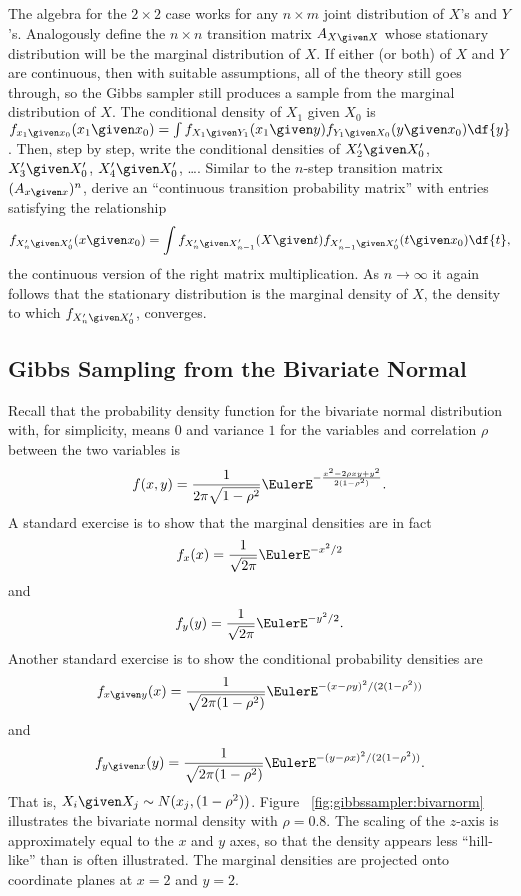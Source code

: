 \documentclass[12pt]{article}
\begin{document}
The algebra for the \( 2 \times 2 \) case works for any \( n \times m \)
joint distribution of \( X \)'s and \( Y \)'s.  Analogously define the \(
n \times n \) transition matrix \( A_{X \given X} \) whose stationary
distribution will be the marginal distribution of \( X \).  If either (or
both) of \( X \) and \( Y \) are continuous, then with suitable
assumptions, all of the theory still goes through, so the Gibbs sampler
still produces a sample from the marginal distribution of \( X \).  The
conditional density of \( X_1 \) given \( X_0 \) is \( f_{x_1 \given x_0}
(x_1 \given x_0) = \int f_{X_1 \given Y_1}(x_1 \given y)f_{Y_1 \given X_0}
(y \given x_0) \df{y} \).  Then, step by step, write the conditional
densities of \( X'_2 \given X'_0 \), \( X'_3 \given X'_0 \), \( X'_4
\given X'_0 \), \dots.  Similar to the \( n \)-step transition matrix \(
(A_{x \given x})^n \), derive an ``continuous transition probability
matrix'' with entries satisfying the relationship
\[
    f_{X'_n \given X'_0}(x \given x_0 ) = \int f_{X'_n \given X'_{n-1}}
    (X \given t) f_{X'_{n-1} \given X'_{0}}(t \given x_0) \df{t},
\] the continuous version of the right matrix multiplication.  As \( n
\to \infty \) it again follows that the stationary distribution is the
marginal density of \( X \), the density to which \( f_{X'_n \given X'_0}
\), converges.

\subsection*{Gibbs Sampling from the Bivariate Normal}

Recall that the probability density function for the bivariate normal
distribution%
with, for simplicity, means \( 0 \) and variance \( 1 \) for the
variables and correlation \( \rho \) between the two variables is
\[
    f(x, y) = \frac{1}{2\pi \sqrt{1 - \rho^2}} \EulerE^{- \frac{x^2 - 2
    \rho x y + y^2}{2(1-\rho^2)}}.
\] A standard exercise is to show that the marginal densities%
are in fact
\[
    f_{x}(x) = \frac{1}{\sqrt{2\pi}} \EulerE^{-x^2/2}
\] and
\[
    f_{y}(y) = \frac{1}{\sqrt{2\pi}} \EulerE^{-y^2/2}.
\] Another standard exercise is to show the conditional probability
densities are
\[
    f_{x \given y}(x) = \frac{1}{\sqrt{2\pi (1-\rho^2)}} \EulerE^{-(x-\rho
    y)^2/ (2(1-\rho^2))}
\] and
\[
    f_{y \given x}(y) = \frac{1}{\sqrt{2\pi (1-\rho^2)}} \EulerE^{-(y-\rho
    x)^2/ (2(1-\rho^2))}.
\] That is, \( X_i \given X_j \sim N(x_j, (1-\rho^2)) \).  Figure~%
\ref{fig:gibbssampler:bivarnorm} illustrates the bivariate normal
density with \( \rho = 0.8 \).  The scaling of the \( z \)-axis is
approximately equal to the \( x \) and \( y \) axes, so that the density
appears less ``hill-like'' than is often illustrated.  The marginal
densities are projected onto coordinate planes at \( x = 2 \) and \( y =
2 \).
\end{document}
